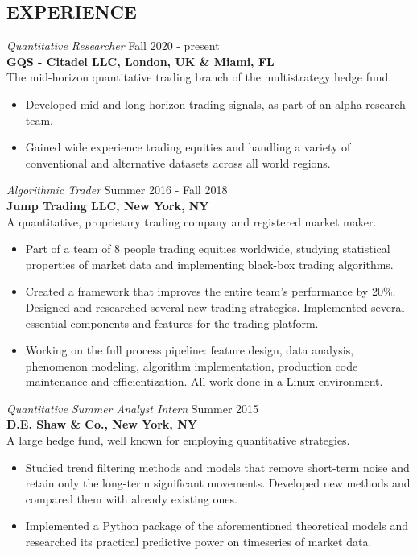 \documentclass[margin]{res}
\begin{document}
\begin{resume}
  \section{EXPERIENCE}
  {\sl Quantitative Researcher} \hfill Fall 2020 - present \\
  \textbf{GQS - Citadel LLC, London, UK \& Miami, FL} \\
  The mid-horizon quantitative trading branch of the multistrategy hedge fund.
  \begin{itemize}  \itemsep -2pt %
    \item Developed mid and long horizon trading signals, as part of an alpha research team.
    \item Gained wide experience trading equities and handling a variety of conventional and alternative datasets across all world regions.
  \end{itemize}
  {\sl Algorithmic Trader} \hfill Summer 2016 - Fall 2018 \\
  \textbf{Jump Trading LLC, New York, NY} \\
  A quantitative, proprietary trading company and registered market maker.
  \begin{itemize}  \itemsep -2pt %
    \item Part of a team of 8 people trading equities worldwide,
      studying statistical properties of market data and implementing black-box
      trading algorithms.
    \item Created a framework that improves the entire team's performance by 20\%.
      Designed and researched several new trading strategies. Implemented several 
      essential components and features for the trading platform.
    \item Working on the full process pipeline: feature design, data analysis,
      phenomenon modeling, algorithm implementation, production code maintenance
      and efficientization. All work done in a Linux environment.
  \end{itemize}

  \newpage

  {\sl Quantitative Summer Analyst Intern} \hfill Summer 2015 \\
  \textbf{D.E. Shaw \& Co., New York, NY} \\
  A large hedge fund, well known for employing quantitative strategies.
  \begin{itemize}  \itemsep -2pt %
    \item Studied trend filtering methods and models
      that remove short-term noise and retain only the long-term significant movements.
      Developed new methods and compared them with already existing ones.
    \item Implemented a Python package of the aforementioned theoretical models
      and researched its practical predictive power on timeseries of market data.
  \end{itemize}


\end{resume}
\end{document}
